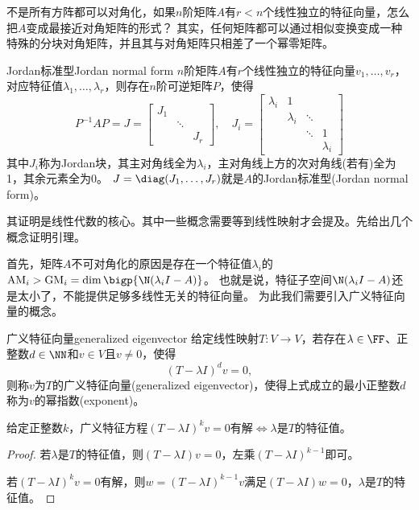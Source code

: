 
不是所有方阵都可以对角化，如果$n$阶矩阵$A$有$r<n$个线性独立的特征向量，怎么把$A$变成最接近对角矩阵的形式？
其实，任何矩阵都可以通过相似变换变成一种特殊的分块对角矩阵，并且其与对角矩阵只相差了一个幂零矩阵。

\begin{theorem}{Jordan标准型}{Jordan normal form}
	$n$阶矩阵$A$有$r$个线性独立的特征向量$v_1,\ldots,v_r$，对应特征值$\lambda_1,\ldots,\lambda_r$，则存在$n$阶可逆矩阵$P$，使得
	\[
		P^{-1}AP=J=\begin{bmatrix}
			J_1             \\
			 & \ddots       \\
			 &        & J_r
		\end{bmatrix},\quad
		J_i=\begin{bmatrix}
			\lambda_i & 1                              \\
			          & \lambda_i & \ddots             \\
			          &           & \ddots & 1         \\
			          &           &        & \lambda_i
		\end{bmatrix}
	\]
	其中$J_i$称为Jordan块，其主对角线全为$\lambda_i$，主对角线上方的次对角线(若有)全为1，其余元素全为0。
	$J=\diag(J_1,\ldots,J_r)$就是$A$的Jordan标准型(Jordan normal form)。
\end{theorem}

其证明是线性代数的核心。其中一些概念需要等到线性映射才会提及。先给出几个概念证明引理。

首先，矩阵$A$不可对角化的原因是存在一个特征值$\lambda_i$的$\AM_i>\GM_i=\dim\bigp{\N(\lambda_iI-A)}$。
也就是说，特征子空间$\N(\lambda_iI-A)$还是太小了，不能提供足够多线性无关的特征向量。
为此我们需要引入广义特征向量的概念。

\begin{definition}{广义特征向量}{generalized eigenvector}
	给定线性映射$T:V\to V$，若存在$\lambda\in\FF$、正整数$d\in\NN$和$v\in V$且$v\neq 0$，使得
	\[
		(T-\lambda I)^dv=0,
	\]
	则称$v$为$T$的广义特征向量(generalized eigenvector)，使得上式成立的最小正整数$d$称为$v$的幂指数(exponent)。
\end{definition}

\begin{theorem}{}{}
	给定正整数$k$，广义特征方程$(T-\lambda I)^kv=0$有解$\iff\lambda$是$T$的特征值。
\end{theorem}

\begin{proof}
	若$\lambda$是$T$的特征值，则$(T-\lambda I)v=0$，左乘$(T-\lambda I)^{k-1}$即可。
	
	若$(T-\lambda I)^kv=0$有解，则$w=(T-\lambda I)^{k-1}v$满足$(T-\lambda I)w=0$，$\lambda$是$T$的特征值。
\end{proof}

